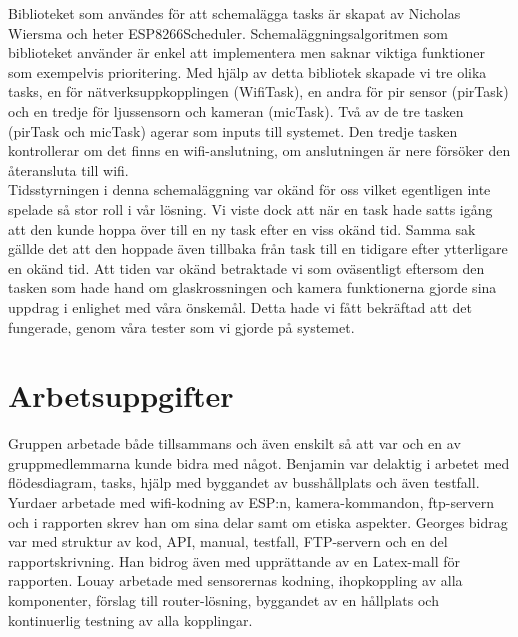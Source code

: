 Biblioteket som användes för att schemalägga tasks är skapat av Nicholas Wiersma och heter ESP8266Scheduler. Schemaläggningsalgoritmen som biblioteket använder är enkel att implementera men saknar viktiga funktioner som exempelvis prioritering. Med hjälp av detta bibliotek  skapade vi tre olika tasks, en för nätverksuppkopplingen (WifiTask), en andra för pir sensor (pirTask) och en tredje för ljussensorn  och kameran (micTask). Två av de tre tasken (pirTask och micTask) agerar som inputs till systemet. Den tredje tasken  kontrollerar om det finns en wifi-anslutning, om anslutningen är nere försöker den återansluta till wifi.\\
Tidsstyrningen i denna schemaläggning var okänd för oss vilket egentligen inte spelade så stor roll i vår lösning. Vi viste dock att när en task hade satts igång att den kunde hoppa över till en ny task efter en viss okänd tid. Samma sak gällde det att den hoppade även tillbaka från task till en tidigare efter ytterligare  en okänd tid. Att tiden var okänd betraktade vi som oväsentligt  eftersom den tasken som hade hand om glaskrossningen och kamera funktionerna gjorde sina uppdrag i enlighet med våra önskemål. Detta hade vi fått bekräftad att det fungerade, genom våra tester som vi gjorde på systemet.






\section{Arbetsuppgifter}
Gruppen arbetade både tillsammans och även enskilt så att var och en av gruppmedlemmarna kunde bidra med något. Benjamin var delaktig i arbetet med flödesdiagram, tasks, hjälp med byggandet av busshållplats och även testfall. Yurdaer arbetade med wifi-kodning av ESP:n, kamera-kommandon, ftp-servern och i rapporten skrev han om sina delar samt om etiska aspekter. Georges bidrag var med struktur av kod, API, manual, testfall, FTP-servern och en del rapportskrivning. Han bidrog även med upprättande av en Latex-mall för rapporten. Louay arbetade med sensorernas kodning, ihopkoppling av alla komponenter, förslag till router-lösning, byggandet av en hållplats och kontinuerlig testning av alla kopplingar. 



 



